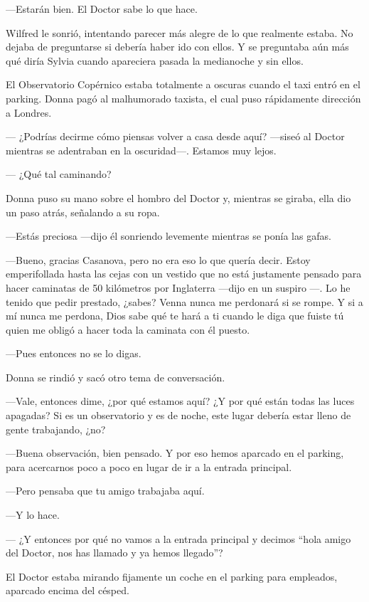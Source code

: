 ---Estarán bien. El Doctor sabe lo que hace.

Wilfred le sonrió, intentando parecer más alegre de lo que realmente
estaba. No dejaba de preguntarse si debería haber ido con ellos. Y se
preguntaba aún más qué diría Sylvia cuando apareciera pasada la
medianoche y sin ellos.

El Observatorio Copérnico estaba totalmente a oscuras cuando el taxi
entró en el parking. Donna pagó al malhumorado taxista, el cual puso
rápidamente dirección a Londres.

--- ¿Podrías decirme cómo piensas volver a casa desde aquí? ---siseó al
Doctor mientras se adentraban en la oscuridad---. Estamos muy lejos.

--- ¿Qué tal caminando?

Donna puso su mano sobre el hombro del Doctor y, mientras se giraba,
ella dio un paso atrás, señalando a su ropa.

---Estás preciosa ---dijo él sonriendo levemente mientras se ponía las
gafas.

---Bueno, gracias Casanova, pero no era eso lo que quería decir. Estoy
emperifollada hasta las cejas con un vestido que no está justamente
pensado para hacer caminatas de 50 kilómetros por Inglaterra ---dijo en
un suspiro ---.  Lo he tenido que pedir prestado, ¿sabes? Venna nunca me
perdonará si se rompe. Y si   a mí nunca me perdona, Dios sabe qué te
hará a ti cuando le diga que fuiste tú quien me obligó a hacer toda la
caminata con él puesto.

---Pues entonces no se lo digas.

Donna se rindió y sacó otro tema de conversación.

---Vale, entonces dime, ¿por qué estamos aquí? ¿Y por qué están todas
las luces apagadas? Si es un observatorio y es de noche, este lugar
debería estar lleno de gente trabajando, ¿no?

---Buena observación, bien pensado. Y por eso hemos aparcado en el
parking, para acercarnos poco a poco en lugar de ir a la entrada
principal.

---Pero pensaba que tu amigo trabajaba aquí.

---Y lo hace.

---  ¿Y entonces por qué no vamos a la entrada principal y decimos ``hola
amigo del Doctor, nos has llamado y ya hemos llegado''?

El Doctor estaba mirando fijamente un coche en el parking para
empleados, aparcado encima del césped.

